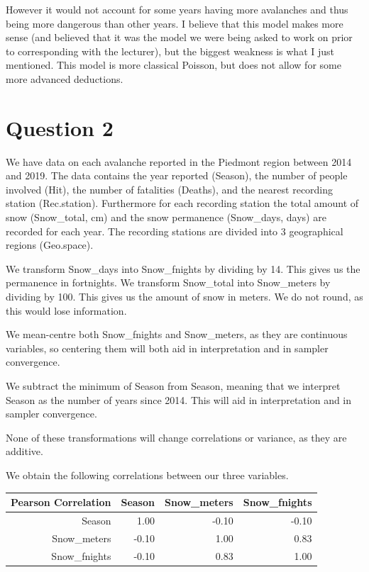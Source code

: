 \documentclass[10pt]{extarticle}
\begin{document}
However it would not account for some years having more avalanches and thus being more dangerous than other years. I believe that this model makes more sense (and believed that it was the model we were being asked to work on prior to corresponding with the lecturer), but the biggest weakness is what I just mentioned. This model is more classical Poisson, but does not allow for some more advanced deductions. 

\section*{Question 2}

We have data on each avalanche reported in the Piedmont region between 2014 and 2019. The data contains the year reported (Season), the number of people involved (Hit), the number of fatalities (Deaths), and the nearest recording station (Rec.station). Furthermore for each recording station the total amount of snow (Snow\_total, cm) and the snow permanence (Snow\_days, days) are recorded for each year. The recording stations are divided into 3 geographical regions (Geo.space). 

We transform Snow\_days into Snow\_fnights by dividing by 14. This gives us the permanence in fortnights. We transform Snow\_total into Snow\_meters by dividing by 100. This gives us the amount of snow in meters.  We do not round, as this would lose information. 

We mean-centre both Snow\_fnights and Snow\_meters, as they are continuous variables, so centering them will both aid in interpretation and in sampler convergence. 

We subtract the minimum of Season from Season, meaning that we interpret Season as the number of years since 2014. This will aid in interpretation and in sampler convergence. 

None of these transformations will change correlations or variance, as they are additive. 

We obtain the following correlations between our three variables. 
\begin{table}[ht]
	\centering
	\begin{tabular}{r|rrr}
	Pearson Correlation	& Season & Snow\_meters & Snow\_fnights \\ 
		\hline
		Season & 1.00 & -0.10 & -0.10 \\ 
		Snow\_meters & -0.10 & 1.00 & 0.83 \\ 
		Snow\_fnights & -0.10 & 0.83 & 1.00 \\ 
	\end{tabular}
\end{table}
\end{document}
